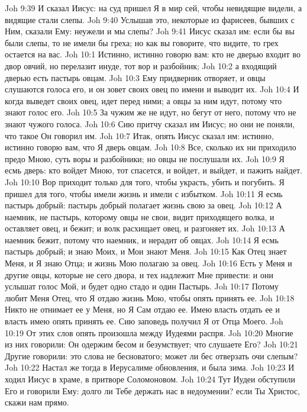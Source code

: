 \rsbpar\vs Joh 9:39 И сказал Иисус: на суд пришел Я в мир сей, чтобы невидящие видели, а видящие стали слепы.
\vs Joh 9:40 Услышав это, некоторые из фарисеев, бывших с Ним, сказали Ему: неужели и мы слепы?
\vs Joh 9:41 Иисус сказал им: если бы вы были слепы, то не имели бы  греха; но как вы говорите, что видите, то грех остается на вас.
\vs Joh 10:1 Истинно, истинно говорю вам: кто не дверью входит во двор овчий, но перелазит инуде, тот вор и разбойник;
\vs Joh 10:2 а входящий дверью есть пастырь овцам.
\vs Joh 10:3 Ему придверник отворяет, и овцы слушаются голоса его, и он зовет своих овец по имени и выводит их.
\vs Joh 10:4 И когда выведет своих овец, идет перед ними; а овцы за ним идут, потому что знают голос его.
\vs Joh 10:5 За чужим же не идут, но бегут от него, потому что не знают чужого голоса.
\vs Joh 10:6 Сию притчу сказал им Иисус; но они не поняли, что такое Он говорил им.
\vs Joh 10:7 Итак, опять Иисус сказал им: истинно, истинно говорю вам, что Я дверь овцам.
\vs Joh 10:8 Все, сколько их ни приходило предо Мною, суть воры и разбойники; но овцы не послушали их.
\vs Joh 10:9 Я есмь дверь: кто войдет Мною, тот спасется, и войдет, и выйдет, и пажить найдет.
\vs Joh 10:10 Вор приходит только для того, чтобы украсть, убить и погубить. Я пришел для того, чтобы имели жизнь и имели с избытком.
\vs Joh 10:11 Я есмь пастырь добрый: пастырь добрый полагает жизнь свою за овец.
\vs Joh 10:12 А наемник, не пастырь, которому овцы не свои, видит приходящего волка, и оставляет овец, и бежит; и волк расхищает овец, и разгоняет их.
\vs Joh 10:13 А наемник бежит, потому что наемник, и нерадит об овцах.
\vs Joh 10:14 Я есмь пастырь добрый; и знаю Моих, и Мои знают Меня.
\vs Joh 10:15 Как Отец знает Меня,  и Я знаю Отца; и жизнь Мою полагаю за овец.
\vs Joh 10:16 Есть у Меня и другие овцы, которые не сего двора, и тех надлежит Мне привести: и они услышат голос Мой, и будет одно стадо и один Пастырь.
\vs Joh 10:17 Потому любит Меня Отец, что Я отдаю жизнь Мою, чтобы опять принять ее.
\vs Joh 10:18 Никто не отнимает ее у Меня, но Я Сам отдаю ее. Имею власть отдать ее и власть имею опять принять ее. Сию заповедь получил Я от Отца Моего.
\vs Joh 10:19 От этих слов опять произошла между Иудеями распря.
\vs Joh 10:20 Многие из них говорили: Он одержим бесом и безумствует; что слушаете Его?
\vs Joh 10:21 Другие говорили: это слова не бесноватого; может ли бес отверзать очи слепым?
\rsbpar\vs Joh 10:22 Настал же тогда в Иерусалиме  обновления, и была зима.
\vs Joh 10:23 И ходил Иисус в храме, в притворе Соломоновом.
\vs Joh 10:24 Тут Иудеи обступили Его и говорили Ему: долго ли Тебе держать нас в недоумении? если Ты Христос, скажи нам прямо.
